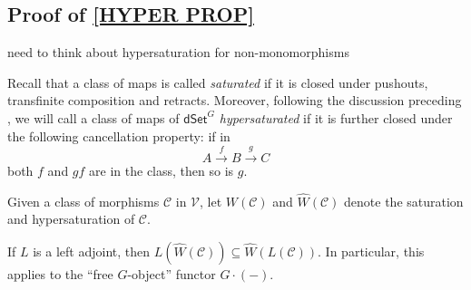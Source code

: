 \documentclass[a4paper,10pt,draft]{article}%
\begin{document}
\subsection{Proof of \cref{HYPER PROP}}


{\color{red} need to think about hypersaturation for non-monomorphisms}

Recall that a class of maps is called \textit{saturated}
if it is closed under pushouts, transfinite composition and retracts.
Moreover, following the discussion preceding \cite[Prop. 3.6.8]{HHM16}, we will call a class of maps of $\mathsf{dSet}^G$ \textit{hypersaturated} if it is further closed under the following cancellation property: if in
\[
A \xrightarrow{f} B \xrightarrow{g} C
\]
both $f$ and $gf$ are in the class, then so is $g$.

\begin{notation}
      Given a class of morphisms $\mathcal{C}$ in $\mathcal V$, let
      $W(\mathcal C)$ and $\hat{W}(\mathcal C)$ denote
      the saturation and hypersaturation of $\mathcal C$.
\end{notation}

\begin{remark}
      If $L$ is a left adjoint, then $L(\hat{W}(\mathcal C)) \subseteq \hat{W}(L(\mathcal C))$.
      In particular, this applies to the ``free $G$-object'' functor $G \cdot (-)$.
\end{remark}
\end{document}
